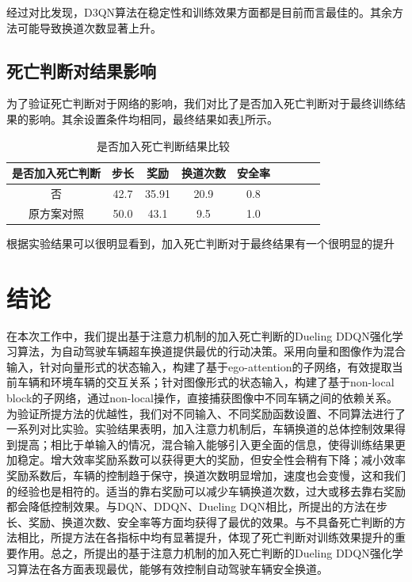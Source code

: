 \documentclass[letterpaper, 10 pt, conference]{ieeeconf}  %
\begin{document}
经过对比发现，D3QN算法在稳定性和训练效果方面都是目前而言最佳的。其余方法可能导致换道次数显著上升。

\subsection[]{死亡判断对结果影响}
为了验证死亡判断对于网络的影响，我们对比了是否加入死亡判断对于最终训练结果的影响。其余设置条件均相同，最终结果如表\ref{deadnot}所示。
\begin{table}[!htbp] 
    \centering
    \caption{是否加入死亡判断结果比较}
    \begin{tabular}{ccccccccccc} %
    \toprule %
    \multicolumn{3}{c}{是否加入死亡判断}& 步长& 奖励&换道次数&安全率\\
    \hline %
    \multicolumn{3}{c}{否}& 42.7& 35.91& 20.9 &0.8& \\   %
    \multicolumn{3}{c}{原方案对照}& 50.0& 43.1& 9.5 &1.0& \\
    \bottomrule %
    \end{tabular}   
    \label{deadnot} 
\end{table}

根据实验结果可以很明显看到，加入死亡判断对于最终结果有一个很明显的提升

\section{结论}
在本次工作中，我们提出基于注意力机制的加入死亡判断的Dueling DDQN强化学习算法，为自动驾驶车辆超车换道提供最优的行动决策。采用向量和图像作为混合输入，针对向量形式的状态输入，构建了基于ego-attention的子网络，有效提取当前车辆和环境车辆的交互关系；针对图像形式的状态输入，构建了基于non-local block的子网络，通过non-local操作，直接捕获图像中不同车辆之间的依赖关系。为验证所提方法的优越性，我们对不同输入、不同奖励函数设置、不同算法进行了一系列对比实验。实验结果表明，加入注意力机制后，车辆换道的总体控制效果得到提高；相比于单输入的情况，混合输入能够引入更全面的信息，使得训练结果更加稳定。增大效率奖励系数可以获得更大的奖励，但安全性会稍有下降；减小效率奖励系数后，车辆的控制趋于保守，换道次数明显增加，速度也会变慢，这和我们的经验也是相符的。适当的靠右奖励可以减少车辆换道次数，过大或移去靠右奖励都会降低控制效果。与DQN、DDQN、Dueling DQN相比，所提出的方法在步长、奖励、换道次数、安全率等方面均获得了最优的效果。与不具备死亡判断的方法相比，所提方法在各指标中均有显著提升，体现了死亡判断对训练效果提升的重要作用。总之，所提出的基于注意力机制的加入死亡判断的Dueling DDQN强化学习算法在各方面表现最优，能够有效控制自动驾驶车辆安全换道。
\end{document}
